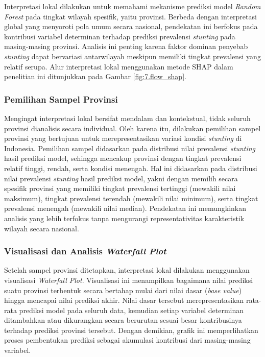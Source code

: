 Interpretasi lokal dilakukan untuk memahami mekanisme prediksi model \textit{Random Forest} pada tingkat wilayah spesifik, yaitu provinsi. Berbeda dengan interpretasi global yang menyoroti pola umum secara nasional, pendekatan ini berfokus pada kontribusi variabel determinan terhadap prediksi prevalensi \textit{stunting} pada masing-masing provinsi. Analisis ini penting karena faktor dominan penyebab \textit{stunting} dapat bervariasi antarwilayah meskipun memiliki tingkat prevalensi yang relatif serupa. Alur interpretasi lokal menggunakan metode SHAP dalam penelitian ini ditunjukkan pada Gambar \ref{fig:7.flow_shap}.

\subsubsection{Pemilihan Sampel Provinsi}
Mengingat interpretasi lokal bersifat mendalam dan kontekstual, tidak seluruh provinsi dianalisis secara individual. Oleh karena itu, dilakukan pemilihan sampel provinsi yang bertujuan untuk merepresentasikan variasi kondisi \textit{stunting} di Indonesia. Pemilihan sampel didasarkan pada distribusi nilai prevalensi \textit{stunting} hasil prediksi model, sehingga mencakup provinsi dengan tingkat prevalensi relatif tinggi, rendah, serta kondisi menengah. Hal ini didasarkan pada distribusi nilai prevalensi \textit{stunting} hasil prediksi model, yakni dengan memilih secara spesifik provinsi yang memiliki tingkat prevalensi tertinggi (mewakili nilai maksimum), tingkat prevalensi terendah (mewakili nilai minimum), serta tingkat prevalensi menengah (mewakili nilai median). Pendekatan ini memungkinkan analisis yang lebih terfokus tanpa mengurangi representativitas karakteristik wilayah secara nasional.

\subsubsection{Visualisasi dan Analisis \textit{Waterfall Plot}}
Setelah sampel provinsi ditetapkan, interpretasi lokal dilakukan menggunakan visualisasi \textit{Waterfall Plot}. Visualisasi ini menampilkan bagaimana nilai prediksi suatu provinsi terbentuk secara bertahap mulai dari nilai dasar (\textit{base value}) hingga mencapai nilai prediksi akhir. Nilai dasar tersebut merepresentasikan rata-rata prediksi model pada seluruh data, kemudian setiap variabel determinan ditambahkan atau dikurangkan secara berurutan sesuai besar kontribusinya terhadap prediksi provinsi tersebut. Dengan demikian, grafik ini memperlihatkan proses pembentukan prediksi sebagai akumulasi kontribusi dari masing-masing variabel.

